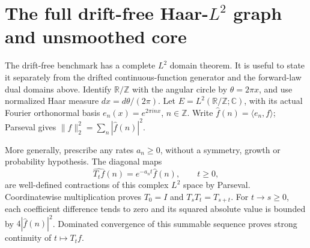 \documentclass[11pt]{article}
\newcommand{\R}{\mathbb R}\newcommand{\C}{\mathbb C}
\begin{document}
\section{The full drift-free Haar-$L^2$ graph and unsmoothed core}
\label{sec:haarcore}
The drift-free benchmark has a complete $L^2$ domain theorem.
It is useful to state it separately from the drifted continuous-function
generator and the forward-law dual domains above. Identify
$\R/\mathbb Z$ with the angular circle by $\theta=2\pi x$, and use
normalized Haar measure $dx=d\theta/(2\pi)$. Let
$E=L^2(\R/\mathbb Z;\C)$, with its actual Fourier orthonormal basis
$e_n(x)=e^{2\pi inx}$, $n\in\mathbb Z$. Write
$\widehat f(n)=\langle e_n,f\rangle$; Parseval gives
$\|f\|_2^2=\sum_n|\widehat f(n)|^2$.

More generally, prescribe any rates $a_n\geq0$, without a symmetry,
growth or probability hypothesis. The diagonal maps
\[
 \widehat{T_tf}(n)=e^{-a_nt}\widehat f(n),\qquad t\geq0,
\]
are well-defined contractions of this complex $L^2$ space by Parseval.
Coordinatewise multiplication proves $T_0=I$ and $T_sT_t=T_{s+t}$.
For $t\to s\geq0$, each coefficient difference tends to zero and
its squared absolute value is bounded by $4|\widehat f(n)|^2$.
Dominated convergence of this summable sequence proves strong
continuity of $t\mapsto T_tf$.
\end{document}
